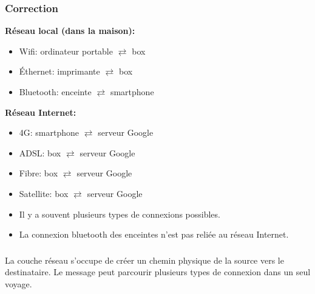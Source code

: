 \documentclass[svgnames,11pt]{beamer}
\begin{document}
\begin{frame}
    \frametitle{Correction}
    
\textbf{Réseau local (dans la maison):}
\begin{itemize}
    \item Wifi: ordinateur portable $\rightleftarrows$ box
    \item Éthernet: imprimante $\rightleftarrows$ box
    \item Bluetooth: enceinte $\rightleftarrows$ smartphone
\end{itemize}
\textbf{Réseau Internet:}
\begin{itemize}
    \item 4G: smartphone $\rightleftarrows$ serveur Google
    \item ADSL: box $\rightleftarrows$ serveur Google
    \item Fibre: box $\rightleftarrows$ serveur Google
    \item Satellite: box $\rightleftarrows$ serveur Google
\end{itemize}
\begin{aretenir}[Remarques]
\begin{itemize}
    \item     Il y a souvent plusieurs types de connexions possibles.
\item La connexion bluetooth des enceintes n'est pas reliée au réseau Internet.
\end{itemize}
\end{aretenir}
\end{frame}
\begin{frame}
    \frametitle{}

    \begin{aretenir}[]
    La couche réseau s'occupe de créer un chemin physique de la source vers le destinataire. Le message peut parcourir plusieurs types de connexion dans un seul voyage.
    \end{aretenir}

\end{frame}
\end{document}
